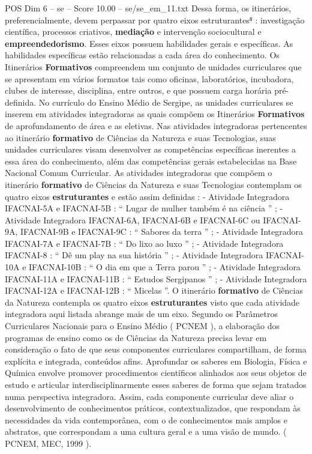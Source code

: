 \begin{textsample}{POS Dim 6 – se – Score 10.00 – se/se\_em\_11.txt}
Dessa forma, os itinerários, preferencialmente, devem perpassar por quatro eixos estruturantes⁸ : investigação científica, processos criativos, \textbf{mediação} e intervenção sociocultural e \textbf{empreendedorismo}.
Esses eixos possuem habilidades gerais e específicas.
As habilidades específicas estão relacionadas a cada área do conhecimento.
Os Itinerários \textbf{Formativos} compreendem um conjunto de unidades curriculares que se apresentam em vários formatos tais como oficinas, laboratórios, incubadora, clubes de interesse, disciplina, entre outros, e que possuem carga horária pré-definida.
No currículo do Ensino Médio de Sergipe, as unidades curriculares se inserem em atividades integradoras as quais compõem os Itinerários \textbf{Formativos} de aprofundamento de área e as eletivas.
Nas atividades integradoras pertencentes ao itinerário \textbf{formativo} de Ciências da Natureza e suas Tecnologias, suas unidades curriculares visam desenvolver as competências específicas inerentes a essa área do conhecimento, além das competências gerais estabelecidas na Base Nacional Comum Curricular.
As atividades integradoras que compõem o itinerário \textbf{formativo} de Ciências da Natureza e suas Tecnologias contemplam os quatro eixos \textbf{estruturantes} e estão assim definidas : - Atividade Integradora IFACNAI-5A e IFACNAI-5B : “ Lugar de mulher também é na ciência ” ; - Atividade Integradora IFACNAI-6A, IFACNAI-6B e IFACNAI-6C ou IFACNAI-9A, IFACNAI-9B e IFACNAI-9C : “ Sabores da terra ” ; - Atividade Integradora IFACNAI-7A e IFACNAI-7B : “ Do lixo ao luxo ” ; - Atividade Integradora IFACNAI-8 : “ Dê um play na sua história ” ; - Atividade Integradora IFACNAI-10A e IFACNAI-10B : “ O dia em que a Terra parou ” ; - Atividade Integradora IFACNAI-11A e IFACNAI-11B : “ Estudos Sergipanos ” ; - Atividade Integradora IFACNAI-12A e IFACNAI-12B : “ Micelas ”.
O itinerário \textbf{formativo} de Ciências da Natureza contempla os quatro eixos \textbf{estruturantes} visto que cada atividade integradora aqui listada abrange mais de um eixo.
Segundo os Parâmetros Curriculares Nacionais para o Ensino Médio ( PCNEM ), a elaboração dos programas de ensino como os de Ciências da Natureza precisa levar em consideração o fato de que seus componentes curriculares compartilham, de forma explícita e integrada, conteúdos afins.
Aprofundar os saberes em Biologia, Física e Química envolve promover procedimentos científicos alinhados aos seus objetos de estudo e articular interdisciplinarmente esses saberes de forma que sejam tratados numa perspectiva integradora.
Assim, cada componente curricular deve aliar o desenvolvimento de conhecimentos práticos, contextualizados, que respondam às necessidades da vida contemporânea, com o de conhecimentos mais amplos e abstratos, que correspondam a uma cultura geral e a uma visão de mundo. ( PCNEM, MEC, 1999 ).

\end{textsample}
